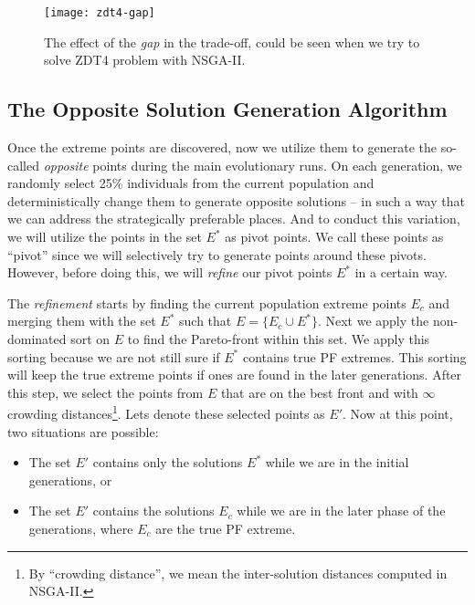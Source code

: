 \documentclass[journal]{IEEEtran}
\let\MYoriglatexcaption\caption
\renewcommand{\caption}[2][\relax]{\MYoriglatexcaption[#2]{#2}}
\begin{document}
\begin{figure}[tp!]
\centering
\texttt{[image: zdt4-gap]}
\caption{The effect of the \textit{gap} in the trade-off, could be seen when we try to solve ZDT4 problem with NSGA-II.}
\label{fig:zdt4-gap-snapshot}
\end{figure}
%
\subsection{The Opposite Solution Generation Algorithm}
\label{sec:generate-pivot-points}
Once the extreme points are discovered, now we utilize them to generate the so-called \textit{opposite} points during the main evolutionary runs. On each generation, we randomly select 25\% individuals from the current population and deterministically change them to generate opposite solutions -- in such a way that we can address the strategically preferable places. And to conduct this variation, we will utilize the points in the set \(E^\ast\) as pivot points. We call these points as ``pivot'' since we will selectively try to generate points around these pivots. However, before doing this, we will \textit{refine} our pivot points \(E^\ast\) in a certain way. 

The \textit{refinement} starts by finding the current population extreme points \(E_c\) and merging them with the set \(E^\ast\) such that \(E = \{E_c \cup E^\ast\}\). Next we apply the non-dominated sort on \(E\) to find the Pareto-front within this set. We apply this sorting because we are not still sure if \(E^\ast\) contains true PF extremes. This sorting will keep the true extreme points if ones are found in the later generations. After this step, we select the points from \(E\) that are on the best front and with \(\infty\) crowding distances\footnote{By ``crowding distance'', we mean the inter-solution distances computed in NSGA-II.}. Lets denote these selected points as \(E'\). Now at this point, two situations are possible:
%
\begin{itemize}
	\item The set \(E'\) contains only the solutions \(E^\ast\) while we are in the initial generations, or
	\item The set \(E'\) contains the solutions \(E_c\) while we are in the later phase of the generations, where \(E_c\) are the true PF extreme. 
\end{itemize}
\end{document}
